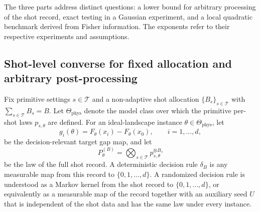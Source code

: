 \documentclass[a4paper,onecolumn,unpublished,nopdfoutputerror]{quantumarticle}
\theoremstyle{plain}
\theoremstyle{definition}
\newcommand{\1}{\mathbf{1}}
\begin{document}
The three parts address distinct questions: a lower bound for arbitrary processing of the shot record, exact testing in a Gaussian experiment, and a local quadratic benchmark derived from Fisher information. The exponents refer to their respective experiments and assumptions.

\subsection{Shot-level converse for fixed allocation and arbitrary post-processing}

Fix primitive settings $s\in\mathcal T$ and a non-adaptive shot allocation
$\{B_s\}_{s\in\mathcal T}$ with $\sum_{s\in\mathcal T}B_s=B$.  Let $\Theta_{\mathrm{phys}}$ denote
the model class over which the primitive per-shot laws $p_{s,\theta}$ are defined.
For an ideal-landscape instance $\theta\in\Theta_{\mathrm{phys}}$, let
\begin{equation}
    g_i(\theta)=F_\theta(x_i)-F_\theta(x_0),
    \qquad i=1,\ldots,d,
\end{equation}
be the decision-relevant target gap map, and let
\begin{equation}
    P^{(B)}_\theta=\bigotimes_{s\in\mathcal T}p_{s,\theta}^{\otimes B_s}
\end{equation}
be the law of the full shot record.  A deterministic decision rule $\delta_B$ is any
measurable map from this record to $\{0,1,\ldots,d\}$.  A randomized decision
rule is understood as a Markov kernel from the shot record to
$\{0,1,\ldots,d\}$, or equivalently as a measurable map of the record together
with an auxiliary seed $U$ that is independent of the shot data and has the same
law under every instance.
\end{document}
